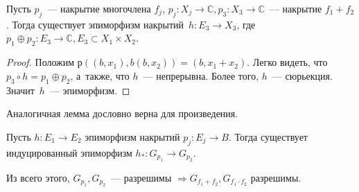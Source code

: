 \documentclass{article}
\begin{document}
\begin{lemma}
	Пусть $p_j$~--- накрытие многочлена $f_j$, $p_j: X_j \rightarrow \mathbb{C},
	p_3: X_3 \rightarrow \mathbb{C}$~--- накрытие $f_1 + f_2$. Тогда существует
	эпиморфизм накрытий~$h: E_3 \rightarrow X_3$, где $p_1 \oplus p_2: E_3
	\rightarrow \mathbb{C}, E_3 \subset X_1 \times X_2$.
\end{lemma}
\begin{proof}
	Положим $р((b, x_1), b(b, x_2)) = (b, x_1 + x_2)$. Легко видеть, что $p_3
	\circ h = p_1 \oplus p_2$, а~также, что $h$~--- непрерывна. Более того,
	$h$~--- сюрьекция. Значит~$h$~--- эпиморфизм.
\end{proof}

\begin{remark}
	Аналогичная лемма дословно верна для произведения.
\end{remark}

\begin{lemma}
	Пусть $h: E_1 \rightarrow E_2$ эпиморфизм накрытий $p_j: E_j \rightarrow B$.
	Тогда существует индуцированный эпиморфизм $h_\ast: G_{p_1} \rightarrow
	G_{p_2}$.
\end{lemma}

Из всего этого, $G_{p_1}, G_{p_2}$~--- разрешимы $\Rightarrow G_{f_1 + f_2},
G_{f_1 \cdot f_2}$ разрешимы.
\end{document}

